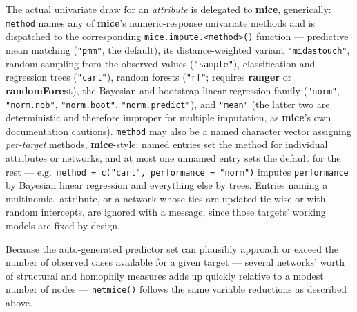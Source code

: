 \documentclass[11pt,a4paper]{article}
\newcommand{\pkg}[1]{\textbf{#1}}
\newcommand{\code}[1]{\texttt{#1}}
\begin{document}
The actual univariate draw for an \emph{attribute} is delegated to
\pkg{mice}, generically: \code{method} names any of \pkg{mice}'s
numeric-response univariate methods and is dispatched to the corresponding
\code{mice.impute.<method>()} function --- predictive mean matching
(\code{"pmm"}, the default), its distance-weighted variant
\code{"midastouch"}, random sampling from the observed values
(\code{"sample"}), classification and regression trees (\code{"cart"}),
random forests (\code{"rf"}; requires \pkg{ranger} or \pkg{randomForest}),
the Bayesian and bootstrap linear-regression family (\code{"norm"},
\code{"norm.nob"}, \code{"norm.boot"}, \code{"norm.predict"}), and
\code{"mean"} (the latter two are deterministic and therefore improper for
multiple imputation, as \pkg{mice}'s own documentation cautions).
\code{method} may also be a named character vector assigning
\emph{per-target} methods, \pkg{mice}-style: named entries set the method
for individual attributes or networks, and at most one unnamed entry sets
the default for the rest --- e.g.\ \code{method = c("cart", performance =
"norm")} imputes \code{performance} by Bayesian linear regression and
everything else by trees. Entries naming a multinomial attribute, or a
network whose ties are updated tie-wise or with random intercepts, are
ignored with a message, since those targets' working models are fixed by
design.

Because the auto-generated predictor set can plausibly approach or exceed
the number of observed cases available for a given target --- several
networks' worth of structural and homophily measures adds up quickly
relative to a modest number of nodes --- \code{netmice()} follows the same variable reductions as described above.
\end{document}
